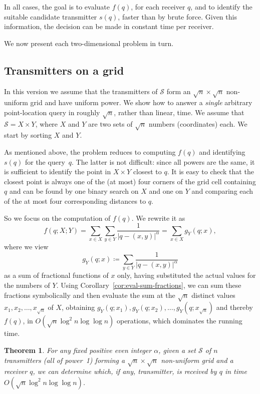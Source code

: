 \documentclass[11pt]{article}
\newtheorem{theorem}{Theorem}[section]
\theoremstyle{remark}
\def\S{\mathcal{S}}
\begin{document}
In all cases, the goal is to evaluate $f(q)$, for each receiver $q$, and
to identify the suitable candidate transmitter $s(q)$,
faster than by brute force.  Given this information, the
decision can be made in constant time per receiver.

We now present each two-dimensional problem in turn.

\subsection{Transmitters on a grid}
\label{sec:trans-grid}



In this version we assume that the transmitters of $\S$ form an $\sqrt{n} \times \sqrt{n}$
non-uniform grid and have uniform power.  We show how to answer a \emph{single}
arbitrary point-location query in roughly $\sqrt{n}$, rather than linear,
time.
We assume that $\S=X \times Y$, where $X$ and $Y$ are two sets of $\sqrt{n}$
numbers (coordinates) each.  We start by sorting $X$ and $Y$.  

As mentioned above, the problem reduces to computing $f(q)$ and
identifying~$s(q)$ for the query~$q$.  The latter is not
difficult: since all powers are the same, it is
sufficient to identify the point in $X \times Y$ closest to $q$.  It is
easy to check that the closest point is always one of the (at most) four
corners of the grid cell containing $q$ and can be found by one binary search on
$X$ and one on $Y$ and comparing each of the at most four corresponding
distances to $q$. 

So we focus on the computation of $f(q)$.  We rewrite it as
\[
  f(q;X;Y) = \sum_{x\in X} \sum_{y\in Y} {\frac{1}{|q-(x,y)|^\alpha}} = 
  \sum_{x\in X} g_Y (q;x),
\] 
where we view
\[
  g_Y(q;x) \coloneqq \sum_{y\in Y} {\frac{1}{|q-(x,y)|^\alpha}}
\]
as a sum of fractional functions of $x$ only, having substituted the actual
values for the numbers of $Y$.  Using
Corollary~\ref{cor:eval-sum-fractions}, we can sum these fractions symbolically and then 
evaluate the sum at the $\sqrt{n}$ distinct values $x_1, x_2, \dots, x_{\sqrt{n}}$ of $X$,
obtaining $g_Y(q;x_1), g_Y(q;x_2), \dots, g_Y(q;x_{\sqrt{n}})$ and thereby $f(q)$, in 
$O(\sqrt{n} \log^2 n \log \log n)$ operations, which dominates the running
time.

\begin{theorem}
  \label{th:2d-transmitters-on-grid}
  For any fixed positive even integer $\alpha$, given a set $\S$ of $n$
  transmitters (all of power~1) forming a $\sqrt{n} \times \sqrt{n}$ non-uniform grid and
	a receiver $q$, we can determine
  which, if any, transmitter, is received by $q$ in
  time $O(\sqrt{n} \log^2 n \log \log n)$.
\end{theorem}
\end{document}
